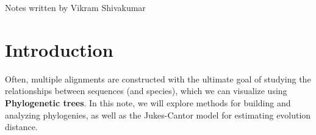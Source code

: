 \documentclass[12pt]{article}
\begin{document}
\thispagestyle{plain}
   \newpage
   \setcounter{page}{1}
   \noindent
   \begin{center}
   \end{center}
   {Notes written by Vikram Shivakumar}
   \vspace*{4mm}


\section{Introduction}
Often, multiple alignments are constructed with the ultimate goal of studying the relationships between sequences (and species), which we can visualize using \textbf{Phylogenetic trees}. In this note, we will explore methods for building and analyzing phylogenies, as well as the Jukes-Cantor model for estimating evolution distance.
\end{document}
